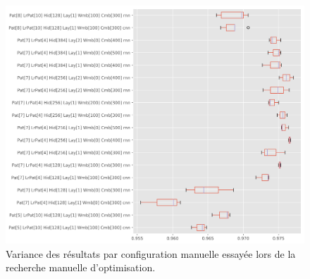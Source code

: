 \begin{figure}
    \centering
    \includegraphics[width=\textwidth]{results/lemmatisation/entrainement/StabilityBoxPlot.png}
    \caption{Variance des résultats par configuration manuelle essayée lors de la recherche manuelle d'optimisation.}
    \label{fig:training_variation_per_model}
\end{figure}